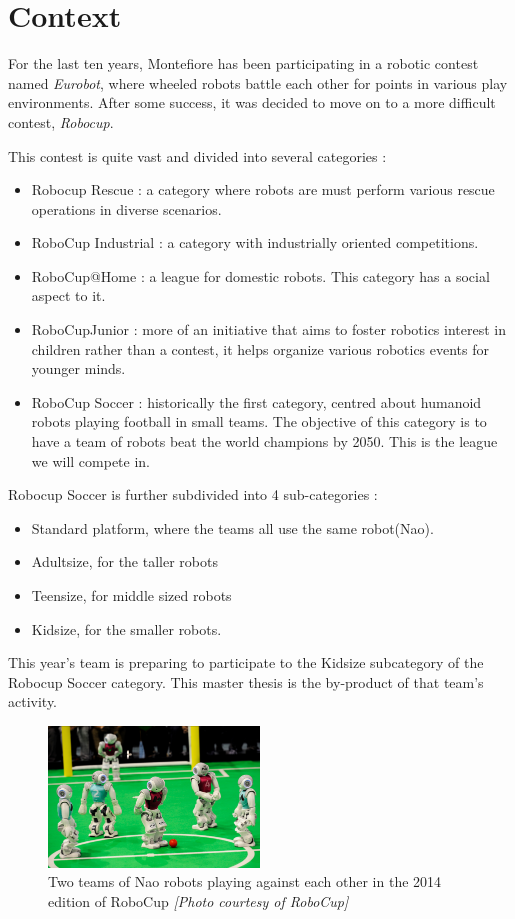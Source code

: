 \section{Context}
For the last ten years, Montefiore has been participating in a robotic contest named \emph{Eurobot}, where wheeled robots battle each other for points in various play environments. After some success, it was decided to move on to a more difficult contest, \emph{Robocup}.

This contest is quite vast and divided into several categories :
\begin{itemize}
\item Robocup Rescue : a category where robots are must perform various rescue operations in diverse scenarios.
\item RoboCup Industrial : a category with industrially oriented competitions.
\item RoboCup@Home : a league for domestic robots. This category has a social aspect to it.
\item RoboCupJunior : more of an initiative that aims to foster robotics interest in children rather than a contest, it helps organize various robotics events for younger minds.
\item RoboCup Soccer : historically the first category, centred about humanoid robots playing football in small teams. The objective of this category is to have a team of robots beat the world champions by 2050. This is the league we will compete in.
\end{itemize}
Robocup Soccer is further subdivided into 4 sub-categories :\begin{itemize}
\item Standard platform, where the teams all use the same robot(Nao).
\item Adultsize, for the taller robots
\item Teensize, for middle sized robots
\item Kidsize, for the smaller robots.
\end{itemize}

This year's team is preparing to participate to the Kidsize subcategory of the Robocup Soccer category. This master thesis is the by-product of that team's activity.

\begin{figure}[htp]
\center
\includegraphics[width=0.5\textwidth]{figures/robocup}
\caption[Two teams of Nao robots playing against each other]{Two teams of Nao robots playing against each other in the 2014 edition of RoboCup \textit{[Photo courtesy of RoboCup]}}
\label{fig:intro_robocup}
\end{figure}

